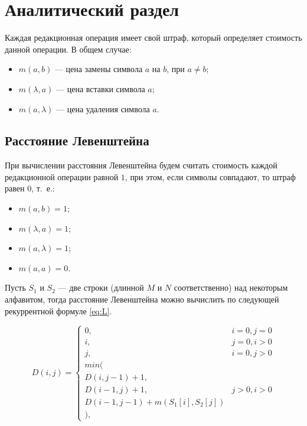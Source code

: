 \chapter{Аналитический раздел}

Каждая редакционная операция имеет свой штраф, который определяет стоимость данной операции. В общем случае:
\begin{itemize}
	\item $ m(a, b) $ --- цена замены символа $ a $ на $ b $, при $ a \ne b $;
	\item $ m(\lambda, a) $ --- цена вставки символа $ a $;
	\item $ m(a, \lambda) $ --- цена удаления символа $ a $.
\end{itemize}


\section{Расстояние Левенштейна}

При вычислении расстояния Левенштейна будем считать стоимость каждой редакционной операции равной $ 1 $, при этом, если символы совпадают, то штраф равен $0$, т.~е.:
\begin{itemize}
	\item $ m(a, b) = 1 $;
	\item $ m(\lambda, a) = 1 $;
	\item $ m(a, \lambda) = 1 $;
	\item $ m(a, a) = 0 $.
\end{itemize}

Пусть $S_1$ и $S_2$ --- две строки (длинной $M$ и $N$ соответственно) над некоторым алфавитом, тогда расстояние Левенштейна можно вычислить по следующей рекуррентной формуле \eqref{eq:L}.

\begin{equation}
	\label{eq:L}
	D(i,j) = \left\{ \begin{array}{ll}
		0, & \textrm{$i = 0, j = 0$}\\
		i, & \textrm{$j = 0, i > 0$}\\
		j, & \textrm{$i = 0, j > 0$}\\
		min(\\
		D(i,j-1)+1,\\
		D(i-1, j) +1, &\textrm{$j>0, i>0$}\\
		D(i-1, j-1) + m(S_{1}[i], S_{2}[j])\\
		),
	\end{array} \right.
\end{equation}

